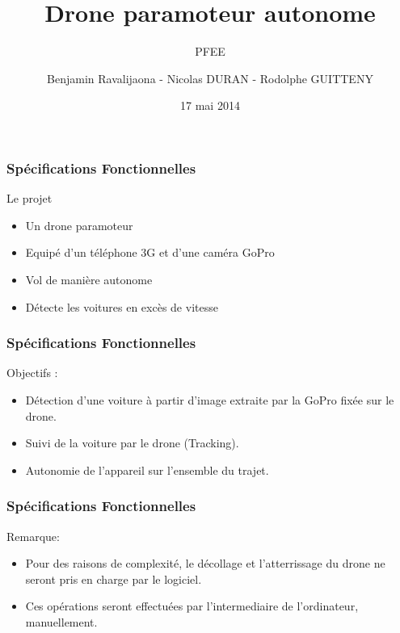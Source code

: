 \documentclass[transparent]{beamer}
\title{Drone paramoteur autonome}
\subtitle{PFEE}
\author{Benjamin  Ravalijaona - Nicolas DURAN - Rodolphe GUITTENY}
\institute{SCIA 2015 \\ EPITA}
\date{17 mai 2014}
\begin{document}
\begin{frame}
	\titlepage
\end{frame}


\begin{frame}
	\frametitle{Spécifications Fonctionnelles}
	\begin{block}{Le projet}
			\begin{itemize}
				\item Un drone paramoteur
				\item Equipé d'un téléphone 3G et d'une caméra GoPro
				\item Vol de manière autonome
				\item Détecte les voitures en excès de vitesse
			\end{itemize}
	\end{block}
\end{frame}

\begin{frame}
	\frametitle{Spécifications Fonctionnelles}
	\begin{block}{Objectifs :}
			\begin{itemize}
				\item Détection d’une voiture à partir d’image extraite par la GoPro fixée sur le drone.
				\item Suivi de la voiture par le drone (Tracking).
				\item Autonomie de l'appareil sur l'ensemble du trajet.
			\end{itemize}
	\end{block}
\end{frame}

\begin{frame}
	\frametitle{Spécifications Fonctionnelles}
	\begin{block}{Remarque:}
			\begin{itemize}
				\item Pour des raisons de complexité, le décollage et l’atterrissage du drone ne seront pris en charge par le logiciel.
				\item Ces opérations seront effectuées par l'intermediaire de l'ordinateur, manuellement.
			\end{itemize}
	\end{block}
\end{frame}
\end{document}
